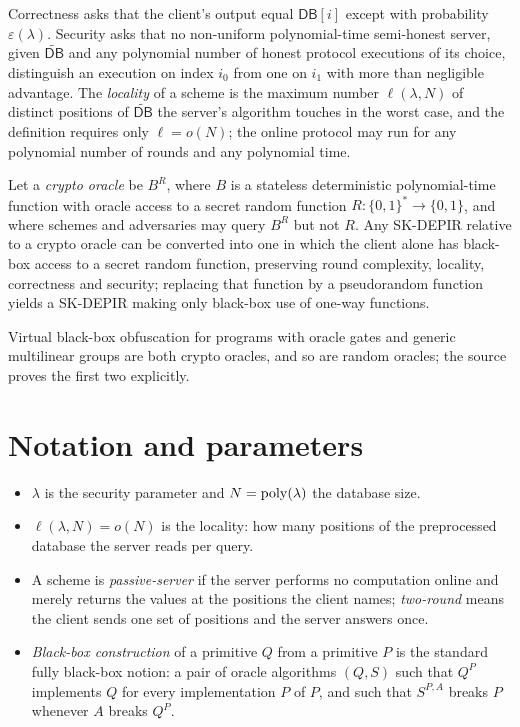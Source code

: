 \documentclass{aicr-conjecture}
\newcommand{\bits}{\{0,1\}}
\newcommand{\DB}{\mathsf{DB}}
\newcommand{\pDB}{\widetilde{\mathsf{DB}}}
\begin{document}
Correctness asks that the client's output equal $\DB[i]$ except with
probability $\varepsilon(\lambda)$. Security asks that no non-uniform
polynomial-time semi-honest server, given $\pDB$ and any polynomial
number of honest protocol executions of its choice, distinguish an
execution on index $i_0$ from one on $i_1$ with more than negligible
advantage. The \emph{locality} of a scheme is the maximum number
$\ell(\lambda,N)$ of distinct positions of $\pDB$ the server's algorithm
touches in the worst case, and the definition requires only
$\ell = o(N)$; the online protocol may run for any polynomial number of
rounds and any polynomial time.

\begin{theorem}\label{thm:main}
Let a \emph{crypto oracle} be $B^{R}$, where $B$ is a stateless
deterministic polynomial-time function with oracle access to a secret
random function $R : \bits^{*} \to \bits$, and where schemes and
adversaries may query $B^{R}$ but not $R$. Any SK-DEPIR relative to a
crypto oracle can be converted into one in which the client alone has
black-box access to a secret random function, preserving round
complexity, locality, correctness and security; replacing that function
by a pseudorandom function yields a SK-DEPIR making only black-box use of
one-way functions.
\end{theorem}

Virtual black-box obfuscation for programs with oracle gates and generic
multilinear groups are both crypto oracles, and so are random oracles;
the source proves the first two explicitly.

\section{Notation and parameters}\label{sec:notation}

\begin{itemize}[nosep]
  \item $\lambda$ is the security parameter and $N = \mathrm{poly}(\lambda)$ the
    database size.
  \item $\ell(\lambda,N) = o(N)$ is the locality: how many positions of
    the preprocessed database the server reads per query.
  \item A scheme is \emph{passive-server} if the server performs no
    computation online and merely returns the values at the positions the
    client names; \emph{two-round} means the client sends one set of
    positions and the server answers once.
  \item \emph{Black-box construction} of a primitive $Q$ from a primitive
    $P$ is the standard fully black-box notion: a pair of oracle
    algorithms $(Q,S)$ such that $Q^{P}$ implements $Q$ for every
    implementation $P$ of $P$, and such that $S^{P,A}$ breaks $P$
    whenever $A$ breaks $Q^{P}$.
\end{itemize}
\end{document}
